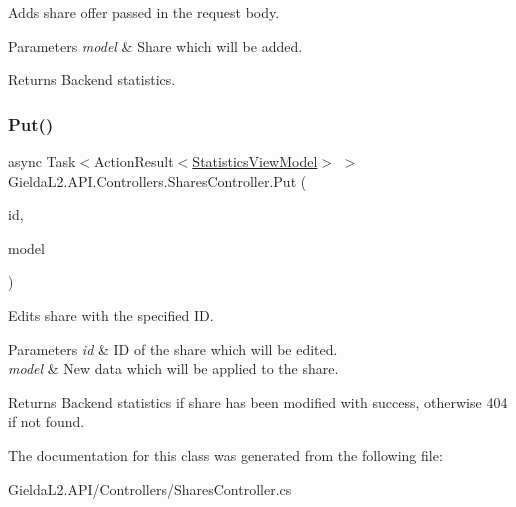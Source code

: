 Adds share offer passed in the request body. 


\begin{DoxyParams}{Parameters}
{\em model} & Share which will be added.\\
\hline
\end{DoxyParams}
\begin{DoxyReturn}{Returns}
Backend statistics.
\end{DoxyReturn}
\mbox{\label{class_gielda_l2_1_1_a_p_i_1_1_controllers_1_1_shares_controller_ab150a6062bfd1d10cb271cdfe0000901}} 
\subsubsection{\texorpdfstring{Put()}{Put()}}
{\footnotesize\ttfamily async Task$<$Action\+Result$<$\mbox{\hyperlink{class_gielda_l2_1_1_a_p_i_1_1_view_models_1_1_view_1_1_statistics_view_model}{Statistics\+View\+Model}}$>$ $>$ Gielda\+L2.\+A\+P\+I.\+Controllers.\+Shares\+Controller.\+Put (\begin{DoxyParamCaption}\item[{int}]{id,  }\item[{\mbox{[}\+From\+Body\mbox{]} \mbox{\hyperlink{class_gielda_l2_1_1_a_p_i_1_1_view_models_1_1_edit_1_1_edit_share_view_model}{Edit\+Share\+View\+Model}}}]{model }\end{DoxyParamCaption})}



Edits share with the specified ID. 


\begin{DoxyParams}{Parameters}
{\em id} & ID of the share which will be edited.\\
\hline
{\em model} & New data which will be applied to the share.\\
\hline
\end{DoxyParams}
\begin{DoxyReturn}{Returns}
Backend statistics if share has been modified with success, otherwise 404 if not found.
\end{DoxyReturn}


The documentation for this class was generated from the following file\+:\begin{DoxyCompactItemize}
\item 
Gielda\+L2.\+A\+P\+I/\+Controllers/Shares\+Controller.\+cs\end{DoxyCompactItemize}
